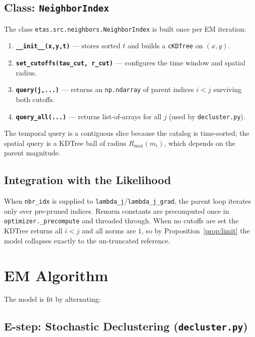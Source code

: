 \documentclass[11pt,a4paper]{article}
\theoremstyle{plain}
\theoremstyle{definition}
\newcommand{\Rmax}{R_{\max}}
\begin{document}
\subsection{Class: \texttt{NeighborIndex}}

The class \texttt{etas.src.neighbors.NeighborIndex} is built once per EM
iteration:
\begin{enumerate}
\item \textbf{\texttt{\_\_init\_\_(x,y,t)}} --- stores sorted $t$ and builds a
      \texttt{cKDTree} on $(x,y)$.
\item \textbf{\texttt{set\_cutoffs(tau\_cut, r\_cut)}} --- configures the time
      window and spatial radius.
\item \textbf{\texttt{query(j,...)}} --- returns an \texttt{np.ndarray} of
      parent indices $i<j$ surviving both cutoffs.
\item \textbf{\texttt{query\_all(...)}} --- returns list-of-arrays for all $j$
      (used by \texttt{decluster.py}).
\end{enumerate}
The temporal query is a contiguous slice because the catalog is time-sorted;
the spatial query is a KDTree ball of radius $\Rmax(m_i)$, which depends on
the parent magnitude.

\subsection{Integration with the Likelihood}

When \texttt{nbr\_idx} is supplied to \texttt{lambda\_j}/\texttt{lambda\_j\_grad},
the parent loop iterates only over pre-pruned indices. Renorm constants are
precomputed once in \texttt{optimizer.\_precompute} and threaded through. When
no cutoffs are set the KDTree returns all $i<j$ and all norms are $1$, so by
Proposition~\ref{prop:limit} the model collapses exactly to the un-truncated
reference.

\section{EM Algorithm}\label{sec:em}

The model is fit by alternating:

\subsection{E-step: Stochastic Declustering (\texttt{decluster.py})}
\end{document}
